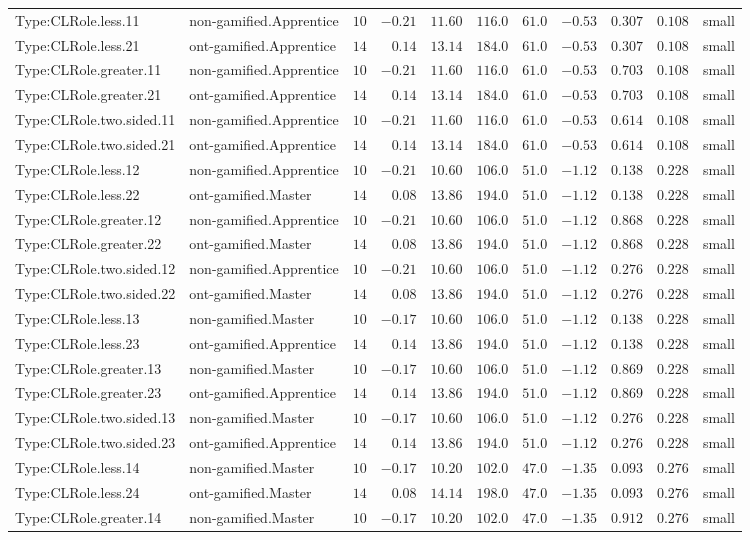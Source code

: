 \documentclass[6pt,a4paper]{article}
\begin{document}
{\begin{longtable}{llrrrrrrrrl}
Type:CLRole.less.11&non-gamified.Apprentice&$10$&$-0.21$&$11.60$&$116.0$&$ 61.0$&$-0.53$&$0.307$&$0.108$&small\tabularnewline
Type:CLRole.less.21&ont-gamified.Apprentice&$14$&$ 0.14$&$13.14$&$184.0$&$ 61.0$&$-0.53$&$0.307$&$0.108$&small\tabularnewline
Type:CLRole.greater.11&non-gamified.Apprentice&$10$&$-0.21$&$11.60$&$116.0$&$ 61.0$&$-0.53$&$0.703$&$0.108$&small\tabularnewline
Type:CLRole.greater.21&ont-gamified.Apprentice&$14$&$ 0.14$&$13.14$&$184.0$&$ 61.0$&$-0.53$&$0.703$&$0.108$&small\tabularnewline
Type:CLRole.two.sided.11&non-gamified.Apprentice&$10$&$-0.21$&$11.60$&$116.0$&$ 61.0$&$-0.53$&$0.614$&$0.108$&small\tabularnewline
Type:CLRole.two.sided.21&ont-gamified.Apprentice&$14$&$ 0.14$&$13.14$&$184.0$&$ 61.0$&$-0.53$&$0.614$&$0.108$&small\tabularnewline
Type:CLRole.less.12&non-gamified.Apprentice&$10$&$-0.21$&$10.60$&$106.0$&$ 51.0$&$-1.12$&$0.138$&$0.228$&small\tabularnewline
Type:CLRole.less.22&ont-gamified.Master&$14$&$ 0.08$&$13.86$&$194.0$&$ 51.0$&$-1.12$&$0.138$&$0.228$&small\tabularnewline
Type:CLRole.greater.12&non-gamified.Apprentice&$10$&$-0.21$&$10.60$&$106.0$&$ 51.0$&$-1.12$&$0.868$&$0.228$&small\tabularnewline
Type:CLRole.greater.22&ont-gamified.Master&$14$&$ 0.08$&$13.86$&$194.0$&$ 51.0$&$-1.12$&$0.868$&$0.228$&small\tabularnewline
Type:CLRole.two.sided.12&non-gamified.Apprentice&$10$&$-0.21$&$10.60$&$106.0$&$ 51.0$&$-1.12$&$0.276$&$0.228$&small\tabularnewline
Type:CLRole.two.sided.22&ont-gamified.Master&$14$&$ 0.08$&$13.86$&$194.0$&$ 51.0$&$-1.12$&$0.276$&$0.228$&small\tabularnewline
Type:CLRole.less.13&non-gamified.Master&$10$&$-0.17$&$10.60$&$106.0$&$ 51.0$&$-1.12$&$0.138$&$0.228$&small\tabularnewline
Type:CLRole.less.23&ont-gamified.Apprentice&$14$&$ 0.14$&$13.86$&$194.0$&$ 51.0$&$-1.12$&$0.138$&$0.228$&small\tabularnewline
Type:CLRole.greater.13&non-gamified.Master&$10$&$-0.17$&$10.60$&$106.0$&$ 51.0$&$-1.12$&$0.869$&$0.228$&small\tabularnewline
Type:CLRole.greater.23&ont-gamified.Apprentice&$14$&$ 0.14$&$13.86$&$194.0$&$ 51.0$&$-1.12$&$0.869$&$0.228$&small\tabularnewline
Type:CLRole.two.sided.13&non-gamified.Master&$10$&$-0.17$&$10.60$&$106.0$&$ 51.0$&$-1.12$&$0.276$&$0.228$&small\tabularnewline
Type:CLRole.two.sided.23&ont-gamified.Apprentice&$14$&$ 0.14$&$13.86$&$194.0$&$ 51.0$&$-1.12$&$0.276$&$0.228$&small\tabularnewline
Type:CLRole.less.14&non-gamified.Master&$10$&$-0.17$&$10.20$&$102.0$&$ 47.0$&$-1.35$&$0.093$&$0.276$&small\tabularnewline
Type:CLRole.less.24&ont-gamified.Master&$14$&$ 0.08$&$14.14$&$198.0$&$ 47.0$&$-1.35$&$0.093$&$0.276$&small\tabularnewline
Type:CLRole.greater.14&non-gamified.Master&$10$&$-0.17$&$10.20$&$102.0$&$ 47.0$&$-1.35$&$0.912$&$0.276$&small\tabularnewline

\end{longtable}}
\end{document}
